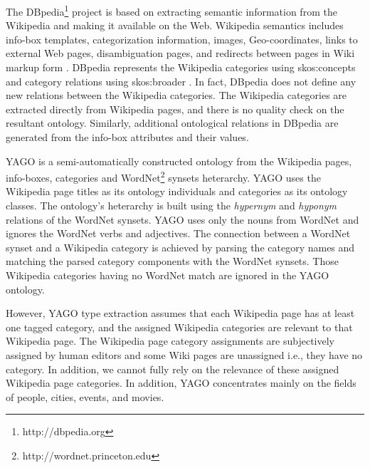 
The DBpedia\footnote{http://dbpedia.org} project is based on extracting  semantic information from the Wikipedia and making it available on the Web.  Wikipedia semantics includes info-box templates, categorization information,  images, Geo-coordinates, links to external Web pages, disambiguation pages,  and redirects between pages in Wiki markup form \cite{Bizer2009}.  DBpedia represents the Wikipedia categories using skos:concepts and category relations using skos:broader \cite{Bizer2009}. In fact,  DBpedia does not define any new relations between the Wikipedia categories.  The Wikipedia categories are extracted directly from Wikipedia pages, and there  is no quality check on the resultant ontology. Similarly, additional ontological relations in DBpedia are generated from the info-box attributes and their values.

YAGO is a semi-automatically constructed ontology from the Wikipedia pages, info-boxes, categories and WordNet\footnote{http://wordnet.princeton.edu} synsets heterarchy\cite {Suchanek2009phd}. YAGO uses the Wikipedia page titles as its ontology individuals and categories as its ontology classes. The ontology's heterarchy is built using the \textit{hypernym} and \textit{hyponym} relations of the WordNet synsets. YAGO uses only the nouns from WordNet and ignores the WordNet verbs and adjectives. The connection between a WordNet synset and a Wikipedia category is achieved by parsing the category names and matching the parsed category components with the WordNet synsets\cite{Suchanek2009phd}. Those Wikipedia categories having no WordNet match are ignored in the YAGO ontology.

However, YAGO type extraction assumes that each Wikipedia page has at least one tagged category, and the assigned Wikipedia categories are relevant to that Wikipedia page. The Wikipedia page category assignments are subjectively assigned by human editors and some Wiki pages are unassigned i.e., they have no category. In addition, we cannot fully rely on the relevance of these assigned Wikipedia page categories. In addition, YAGO concentrates mainly on the fields of people, cities, events, and movies\cite{Suchanek2009phd}.
